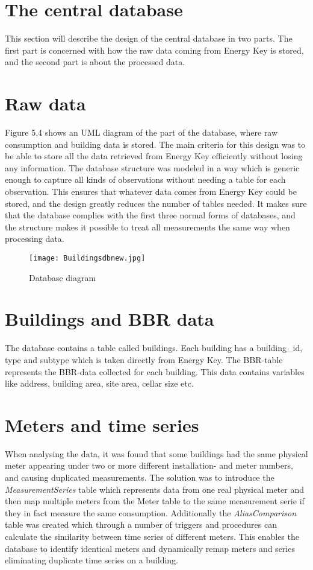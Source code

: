 \section{The central database}
This section will describe the design of the central database in two parts. The first part is concerned with how the raw data coming from Energy Key is stored, and the second part is about the processed data.
\section*{Raw data}
Figure 5,4 shows an UML diagram of the part of the database, where raw consumption and building data is stored. The main criteria for this design was to be able to store all the data retrieved from Energy Key efficiently without losing any information. The database structure was modeled in a way which is generic enough to capture all kinds of observations without needing a table for each observation. This ensures that whatever data comes from Energy Key could be stored, and the design greatly reduces the number of tables needed. It makes sure that the database complies with the first three normal forms of databases, and the structure makes it possible to treat all measurements the same way when processing data.
\begin{figure}
\texttt{[image: Buildingsdbnew.jpg]}
\caption{Database diagram}
\end{figure}
\section*{Buildings and BBR data}
The database contains a table called buildings. Each building has a building\_id, type and subtype which is taken directly from Energy Key. The BBR-table represents the BBR-data collected for each building. This data contains variables like address, building area, site area, cellar size etc. 
\section*{Meters and time series}
When analysing the data, it was found that some buildings had the same physical meter appearing under two or more different installation- and meter numbers, and causing duplicated measurements. The solution was to introduce the \emph{MeasurementSeries} table which represents data from one real physical meter and then map multiple meters from the Meter table to the same measurement serie if they in fact measure the same consumption. Additionally the \emph{AliasComparison} table was created which through a number of triggers and procedures can calculate the similarity between time series of different meters. This enables the database to identify identical meters and dynamically remap meters and series eliminating duplicate time series on a building.
